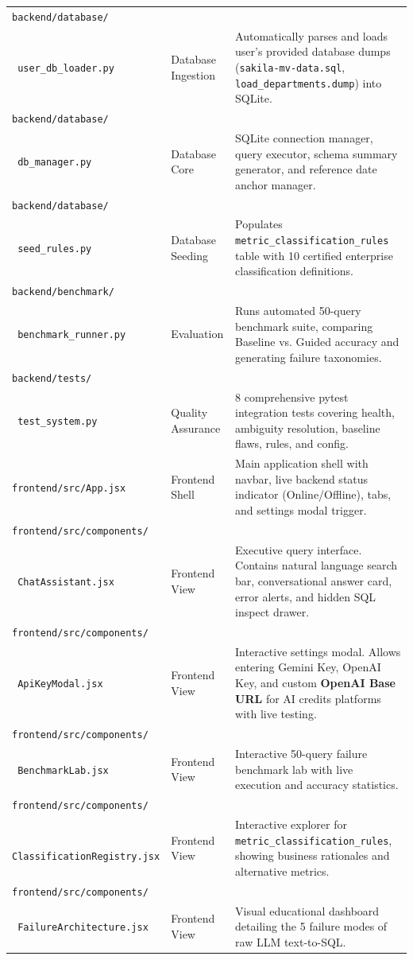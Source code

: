\documentclass[10pt,a4paper]{article}
\begin{document}
\begin{tabularx}{\textwidth}{l p{3.2cm} X}
\addlinespace
\texttt{backend/database/} \\
\texttt{  user\_db\_loader.py} & Database Ingestion & Automatically parses and loads user's provided database dumps (\texttt{sakila-mv-data.sql}, \texttt{load\_departments.dump}) into SQLite. \\
\addlinespace
\texttt{backend/database/} \\
\texttt{  db\_manager.py} & Database Core & SQLite connection manager, query executor, schema summary generator, and reference date anchor manager. \\
\addlinespace
\texttt{backend/database/} \\
\texttt{  seed\_rules.py} & Database Seeding & Populates \texttt{metric\_classification\_rules} table with 10 certified enterprise classification definitions. \\
\addlinespace
\texttt{backend/benchmark/} \\
\texttt{  benchmark\_runner.py} & Evaluation & Runs automated 50-query benchmark suite, comparing Baseline vs. Guided accuracy and generating failure taxonomies. \\
\addlinespace
\texttt{backend/tests/} \\
\texttt{  test\_system.py} & Quality Assurance & 8 comprehensive pytest integration tests covering health, ambiguity resolution, baseline flaws, rules, and config. \\
\addlinespace
\texttt{frontend/src/App.jsx} & Frontend Shell & Main application shell with navbar, live backend status indicator (Online/Offline), tabs, and settings modal trigger. \\
\addlinespace
\texttt{frontend/src/components/} \\
\texttt{  ChatAssistant.jsx} & Frontend View & Executive query interface. Contains natural language search bar, conversational answer card, error alerts, and hidden SQL inspect drawer. \\
\addlinespace
\texttt{frontend/src/components/} \\
\texttt{  ApiKeyModal.jsx} & Frontend View & Interactive settings modal. Allows entering Gemini Key, OpenAI Key, and custom \textbf{OpenAI Base URL} for AI credits platforms with live testing. \\
\addlinespace
\texttt{frontend/src/components/} \\
\texttt{  BenchmarkLab.jsx} & Frontend View & Interactive 50-query failure benchmark lab with live execution and accuracy statistics. \\
\addlinespace
\texttt{frontend/src/components/} \\
\texttt{  ClassificationRegistry.jsx} & Frontend View & Interactive explorer for \texttt{metric\_classification\_rules}, showing business rationales and alternative metrics. \\
\addlinespace
\texttt{frontend/src/components/} \\
\texttt{  FailureArchitecture.jsx} & Frontend View & Visual educational dashboard detailing the 5 failure modes of raw LLM text-to-SQL. \\
\bottomrule
\end{tabularx}
\normalsize
\end{document}
